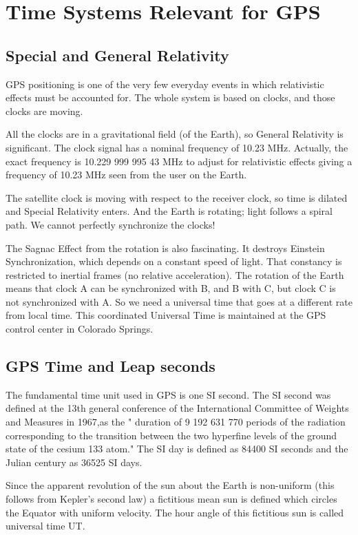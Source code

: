 \section{Time Systems Relevant for GPS}

	\subsection{Special and General Relativity}
	GPS positioning is one of the very few everyday events in which relativistic effects must be accounted for. The whole system is based on clocks, and those clocks are moving.
	
	All the clocks are in a gravitational field (of the Earth), so General Relativity is significant. The clock signal has a nominal frequency of 10.23 MHz. Actually, the exact frequency is 10.229 999 995 43 MHz to adjust for relativistic effects giving a frequency of 10.23 MHz seen from the user on the Earth.
	
	The satellite clock is moving with respect to the receiver clock, so time is dilated and Special Relativity enters. And the Earth is rotating; light follows a spiral path. We cannot perfectly synchronize the clocks!
	
	The Sagnac Effect from the rotation is also fascinating. It destroys Einstein Synchronization, which depends on a constant speed of light. That constancy is restricted to inertial frames (no relative acceleration). The rotation of the Earth means that clock A can be synchronized with B, and B with C, but clock C is not synchronized with A. So we need a universal time that goes at a different rate from local time. This coordinated Universal Time is maintained at the GPS control center in Colorado Springs.
	\subsection{GPS Time and Leap seconds}
	
	The fundamental time unit used in GPS is one SI second. The SI second was defined at the 13th general conference of the International Committee of Weights and Measures in 1967,as the " duration of 9 192 631 770 periods of the radiation corresponding to the transition between the two hyperfine levels of the ground state of the cesium 133 atom." The SI day is defined as 84400 SI seconds and the Julian century as 36525 SI days.
	
	Since the apparent revolution of the sun about the Earth is non-uniform (this follows from Kepler’s second law) a fictitious mean sun is defined which circles the Equator with uniform velocity. The hour angle of this fictitious sun is called universal time UT.
	
